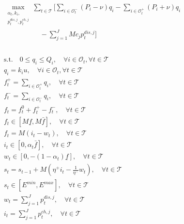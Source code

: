 \documentclass[10pt,twocolumn]{article}
\begin{document}
\begin{subequations}
\begin{align}
& \max_{\substack{\alpha_t, k_i, \\ p_t^{dis,j}, p_t^{ch,j}}} \sum_{t \in \mathcal{T}} \Bigg[ \sum_{i \in \mathcal{O}_t^-} (P_i - \nu) q_i - \sum_{i \in \mathcal{O}_t^+} (P_i + \nu) q_i \nonumber \\
& \phantom{\max_{\substack{f_t, s_t, \alpha_t, \\ q_i, k_i, p_t^{dis,j}}}} \quad - \sum_{j=1}^J M c_j p_t^{dis,j} \Bigg] \label{eq:health_obj} \\
& \text{s.t.} \quad 0 \leq q_i \leq Q_i, \quad \forall i \in \mathcal{O}_t, \forall t \in \mathcal{T} \label{eq:order_limits} \\
& q_i = k_i u, \quad \forall i \in \mathcal{O}_t, \forall t \in \mathcal{T} \label{eq:discrete_trade} \\
& f_t^+ = \sum_{i \in \mathcal{O}_t^+} q_i, \quad \forall t \in \mathcal{T} \label{eq:total_buy} \\
& f_t^- = \sum_{i \in \mathcal{O}_t^-} q_i, \quad \forall t \in \mathcal{T} \label{eq:total_sell} \\
& f_t = f_t^0 + f_t^+ - f_t^-, \quad \forall t \in \mathcal{T} \label{eq:net_position} \\
& f_t \in [M \underline{f}, M \bar{f}], \quad \forall t \in \mathcal{T} \label{eq:power_bounds} \\
& f_t = M(i_t - w_t), \quad \forall t \in \mathcal{T} \label{eq:injection_withdrawal} \\
& i_t \in [0, \alpha_t \bar{f}], \quad \forall t \in \mathcal{T} \label{eq:injection_binary} \\
& w_t \in [0, -(1-\alpha_t)\underline{f}], \quad \forall t \in \mathcal{T} \label{eq:withdrawal_binary} \\
& s_t = s_{t-1} + M(\eta^+ i_t - \frac{1}{\eta^-} w_t), \quad \forall t \in \mathcal{T} \label{eq:storage_dynamics} \\
& s_t \in [E^{min}, E^{max  }], \quad \forall t \in \mathcal{T} \label{eq:storage_capacity} \\
& w_t = \sum_{j=1}^J p_t^{dis,j}, \quad \forall t \in \mathcal{T} \label{eq:total_discharge} \\
& i_t = \sum_{j=1}^J p_t^{ch,j}, \quad \forall t \in \mathcal{T} \label{eq:total_charge} \\

\end{align}
\end{subequations}
\end{document}

